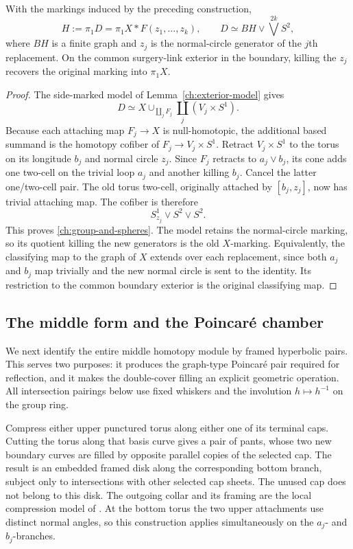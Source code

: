 \begin{proposition}
\label{ch:homotopy-type}
With the markings induced by the preceding construction,
\begin{equation}
\label{ch:group-and-spheres}
 H:=\pi_1D=\pi_1X*F(z_1,\ldots,z_k),\qquad
 D\simeq BH\vee\bigvee^{2k}S^2,
\end{equation}
where $BH$ is a finite graph and $z_j$ is the normal-circle generator
of the $j$th replacement.  On the common surgery-link exterior in
the boundary, killing the $z_j$ recovers the original marking into
$\pi_1X$.
\end{proposition}

\begin{proof}
The side-marked model of Lemma~\ref{ch:exterior-model} gives
\[
 D\simeq X\cup_{\coprod_jF_j}\coprod_j(V_j\times S^1).
\]
Because each attaching map $F_j\to X$ is null-homotopic, the
additional based summand is the homotopy cofiber of
$F_j\to V_j\times S^1$.  Retract $V_j\times S^1$ to the torus
on its longitude $b_j$ and normal circle $z_j$.  Since $F_j$
retracts to $a_j\vee b_j$, its cone adds one two-cell on the
trivial loop $a_j$ and another killing $b_j$.  Cancel the latter
one/two-cell pair.  The old torus two-cell, originally attached
by $[b_j,z_j]$, now has trivial attaching map.  The cofiber is
therefore
\[
 S^1_{z_j}\vee S^2\vee S^2.
\]
This proves \eqref{ch:group-and-spheres}.  The model retains the
normal-circle marking, so its quotient killing the new generators
is the old $X$-marking.  Equivalently, the classifying map to the
graph of $X$ extends over each replacement, since both $a_j$ and
$b_j$ map trivially and the new normal circle is sent to the
identity.  Its restriction to the common boundary exterior is the
original classifying map.
\end{proof}

\subsection{The middle form and the Poincar\'e chamber}

We next identify the entire middle homotopy module by framed
hyperbolic pairs.  This serves two purposes: it produces the
graph-type Poincar\'e pair required for reflection, and it makes
the double-cover filling an explicit geometric operation.
All intersection pairings below use fixed whiskers and the
involution $h\mapsto h^{-1}$ on the group ring.

Compress either upper punctured torus along either one of its
terminal caps.  Cutting the torus along that basis curve gives a
pair of pants, whose two new boundary curves are filled by opposite
parallel copies of the selected cap.  The result is an embedded
framed disk along the corresponding bottom branch, subject only
to intersections with other selected cap sheets.  The unused cap
does not belong to this disk.  The outgoing collar and its framing
are the local compression model of \cite[Lemma~2.4]{MT}.  At the
bottom torus the two upper attachments use distinct normal angles,
so this construction applies simultaneously on the $a_j$- and
$b_j$-branches.

